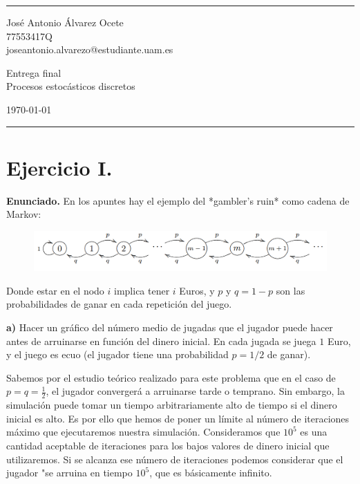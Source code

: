 \documentclass[a4paper]{article}
\begin{document}
	

\fancyhead[C]{}
\hrule \medskip %
\begin{minipage}{0.295\textwidth} 
	\raggedright
	\footnotesize
	José Antonio Álvarez Ocete \hfill\\   
	77553417Q \hfill\\
	joseantonio.alvarezo@estudiante.uam.es
\end{minipage}
\begin{minipage}{0.4\textwidth} 
	\centering 
	\large 
	Entrega final\\ 
	\normalsize 
	Procesos estocásticos discretos\\ 
\end{minipage}
\begin{minipage}{0.295\textwidth} 
	\raggedleft
	\today\hfill\\
\end{minipage}
\medskip\hrule 
\bigskip


\section*{Ejercicio I.}

\textbf{Enunciado.} En los apuntes hay el ejemplo del *gambler's ruin* como cadena de Markov:

\begin{figure}[H]
	\includegraphics[scale=.14]{figures/gamblers_ruin}
	\centering
\end{figure}

Donde estar en el nodo $i$ implica tener $i$ Euros, y $p$ y $q=1-p$ son las probabilidades de ganar en cada repetición del juego.

\textbf{a)} Hacer un gráfico del número medio de jugadas que el jugador puede hacer antes de arruinarse en función del dinero inicial. En cada jugada se juega $1$ Euro, y el juego es ecuo (el jugador tiene una probabilidad $p=1/2$ de ganar).

Sabemos por el estudio teórico realizado para este problema que en el caso de $p=q=\frac{1}{2}$, el jugador convergerá a arruinarse tarde o temprano. Sin embargo, la simulación puede tomar un tiempo arbitrariamente alto de tiempo si el dinero inicial es alto. Es por ello que hemos de poner un límite al número de iteraciones máximo que ejecutaremos nuestra simulación. Consideramos que $10^5$ es una cantidad aceptable de iteraciones para los bajos valores de dinero inicial que utilizaremos. Si se alcanza ese número de iteraciones podemos considerar que el jugador "se arruina en tiempo $10^5$, que es básicamente infinito.
\end{document}
